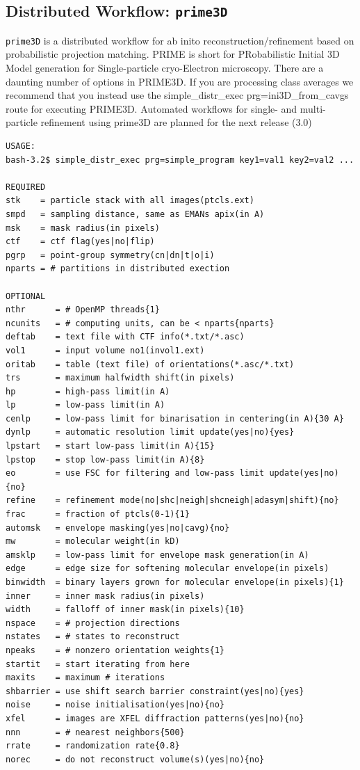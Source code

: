 \documentclass[a4paper,11pt]{article}
\newcommand{\prgname}[1]{\textcolor{NavyBlue}{\texttt{#1}}}
\begin{document}
\subsection{Distributed Workflow: \prgname{prime3D}}
\label{prime3D}
\prgname{prime3D} is a distributed workflow for ab inito reconstruction/refinement based on probabilistic projection matching. PRIME is short for PRobabilistic Initial 3D Model generation for Single-particle cryo-Electron microscopy. There are a daunting number of options in PRIME3D. If you are processing class averages we recommend that you instead use the simple\_distr\_exec prg=ini3D\_from\_cavgs route for executing PRIME3D. Automated workflows for single- and multi-particle refinement using prime3D are planned for the next release (3.0)

\begin{verbatim}
USAGE:
bash-3.2$ simple_distr_exec prg=simple_program key1=val1 key2=val2 ...

REQUIRED
stk    = particle stack with all images(ptcls.ext)
smpd   = sampling distance, same as EMANs apix(in A)
msk    = mask radius(in pixels)
ctf    = ctf flag(yes|no|flip)
pgrp   = point-group symmetry(cn|dn|t|o|i)
nparts = # partitions in distributed exection

OPTIONAL
nthr      = # OpenMP threads{1}
ncunits   = # computing units, can be < nparts{nparts}
deftab    = text file with CTF info(*.txt/*.asc)
vol1      = input volume no1(invol1.ext)
oritab    = table (text file) of orientations(*.asc/*.txt)
trs       = maximum halfwidth shift(in pixels)
hp        = high-pass limit(in A)
lp        = low-pass limit(in A)
cenlp     = low-pass limit for binarisation in centering(in A){30 A}
dynlp     = automatic resolution limit update(yes|no){yes}
lpstart   = start low-pass limit(in A){15}
lpstop    = stop low-pass limit(in A){8}
eo        = use FSC for filtering and low-pass limit update(yes|no){no}
refine    = refinement mode(no|shc|neigh|shcneigh|adasym|shift){no}
frac      = fraction of ptcls(0-1){1}
automsk   = envelope masking(yes|no|cavg){no}
mw        = molecular weight(in kD)
amsklp    = low-pass limit for envelope mask generation(in A)
edge      = edge size for softening molecular envelope(in pixels)
binwidth  = binary layers grown for molecular envelope(in pixels){1}
inner     = inner mask radius(in pixels)
width     = falloff of inner mask(in pixels){10}
nspace    = # projection directions
nstates   = # states to reconstruct
npeaks    = # nonzero orientation weights{1}
startit   = start iterating from here
maxits    = maximum # iterations
shbarrier = use shift search barrier constraint(yes|no){yes}
noise     = noise initialisation(yes|no){no}
xfel      = images are XFEL diffraction patterns(yes|no){no}
nnn       = # nearest neighbors{500}
rrate     = randomization rate{0.8}
norec     = do not reconstruct volume(s)(yes|no){no}
\end{verbatim}
\end{document}
